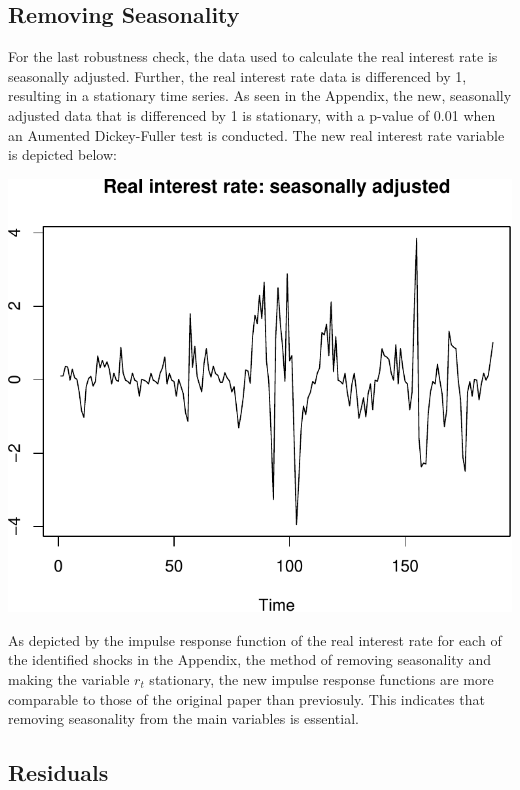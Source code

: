 \documentclass[11pt,preprint, authoryear]{elsarticle}
\numberwithin{equation}{section}
\numberwithin{figure}{section}
\numberwithin{table}{section}
\begin{document}
\hypertarget{removing-seasonality}{%
\subsection{Removing Seasonality}\label{removing-seasonality}}

For the last robustness check, the data used to calculate the real
interest rate is seasonally adjusted. Further, the real interest rate
data is differenced by 1, resulting in a stationary time series. As seen
in the Appendix, the new, seasonally adjusted data that is differenced
by 1 is stationary, with a p-value of 0.01 when an Aumented
Dickey-Fuller test is conducted. The new real interest rate variable is
depicted below:

\includegraphics{TS_proj_files/figure-latex/unnamed-chunk-23-1.pdf}

As depicted by the impulse response function of the real interest rate
for each of the identified shocks in the Appendix, the method of
removing seasonality and making the variable \(r_t\) stationary, the new
impulse response functions are more comparable to those of the original
paper than previosuly. This indicates that removing seasonality from the
main variables is essential.

\hypertarget{residuals}{%
\subsection{Residuals}\label{residuals}}
\end{document}
